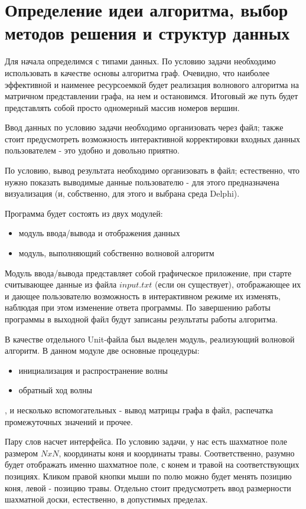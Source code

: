 \section{Определение идеи алгоритма, выбор методов решения и структур данных}
\par
Для начала определимся с типами данных. По условию задачи необходимо
использовать в качестве основы алгоритма граф. Очевидно, что наиболее
эффективной и наименее ресурсоемкой будет реализация волнового алгоритма на матричном
представлении графа, на нем и остановимся. Итоговый же путь будет представлять
собой просто одномерный массив номеров вершин.
\par
Ввод данных по условию задачи необходимо организовать через файл; также стоит предусмотреть
возможность интерактивной корректировки входных данных пользователем - это
удобно и довольно приятно.
\par
По условию, вывод результата необходимо организовать в файл; естественно, что
нужно показать выводимые данные пользователю - для этого предназначена
визуализация (и, собственно, для этого и выбрана среда Delphi).
\par
Программа будет состоять из двух модулей:
\begin{itemize}
\item модуль ввода/вывода и отображения
данных
\item модуль, выполняющий собственно волновой алгоритм
\end{itemize}
Модуль ввода/вывода представляет собой графическое приложение, при старте
считывающее данные из файла $input.txt$ (если он существует), отображающее их
и дающее пользователю возможность в интерактивном режиме их изменять, наблюдая
при этом изменение ответа программы. По завершению работы программы в выходной
файл будут записаны результаты работы алгоритма.
\par
В качестве отдельного Unit-файла был выделен модуль, реализующий волновой
алгоритм. В данном модуле две основные процедуры:
\begin{itemize}
\item инициализация и распространение волны
\item обратный ход волны
\end{itemize},
и несколько вспомогательных - вывод матрицы графа в файл, распечатка
промежуточных значений и прочее.
\par
Пару слов насчет интерфейса. 
По условию задачи, у нас есть шахматное поле размером $NxN$, координаты коня и
координаты травы. Соответственно, разумно будет отображать именно шахматное
поле, с конем и травой на соответствующих позициях. Кликом правой кнопки мыши
по полю можно будет менять позицию коня, левой - позицию травы. Отдельно стоит
предусмотреть ввод размерности шахматной доски, естественно, в допустимых
пределах.
\pagebreak

